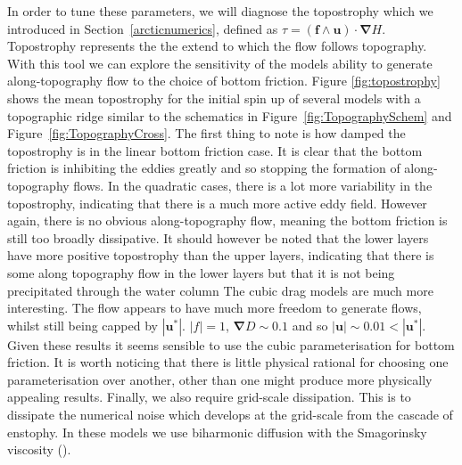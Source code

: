 \documentclass[12pt,a4paper]{report}
\newcommand*\figref[1]{Figure~\ref{#1}}
\newcommand*\secref[1]{Section~\ref{#1}}
\begin{document}
  In order to tune these parameters, we will diagnose the
  topostrophy which we introduced in \secref{arcticnumerics},
  defined as
  $\tau = \left(\boldsymbol{ f } \wedge
  \boldsymbol{ u } \right) \cdot \boldsymbol{\nabla} H $. 
  Topostrophy represents the the extend to which the flow
  follows topography. With this tool we can explore the sensitivity of the models
  ability to generate along-topography flow to the choice of bottom friction. 
  Figure \ref{fig:topostrophy} shows the mean topostrophy for the
  initial spin up of several models with a topographic ridge similar to
  the schematics in \figref{fig:TopographySchem} and
	\figref{fig:TopographyCross}. The first thing to note is how damped the 
  topostrophy is in the linear
  bottom friction case. It is clear that the bottom friction is inhibiting the 
  eddies greatly and so stopping the formation of along-topography flows. In
  the quadratic cases, there is a lot more variability in the topostrophy, indicating
  that there is a much more active eddy field. However again, there is no obvious
  along-topography flow, meaning the bottom friction is still too broadly dissipative.
  It should however be noted that the lower layers have more positive topostrophy than
  the upper layers, indicating that there is some along topography flow in the lower 
  layers but that it is not being precipitated  through the water column
  The cubic drag models are much more interesting. The flow appears to have much more
  freedom to generate flows, whilst still being capped by $\left|\boldsymbol{u}^{\ast}\right|$. $\left|f\right| = 1$, $\boldsymbol{\nabla} D \sim 0.1$ and so $\left|\boldsymbol{u}\right| \sim 0.01 < \left|\boldsymbol{u}^{\ast}\right|$.
  Given these results it seems sensible to use the cubic parameterisation for bottom 
  friction. It is worth noticing that there is little physical rational for choosing
  one parameterisation over another, other than one might produce more physically 
  appealing results. Finally, we also require grid-scale dissipation. This is to dissipate the
  numerical noise which develops at the grid-scale from the cascade of enstophy.
  In these models we use biharmonic diffusion with the Smagorinsky viscosity (\cite{smagorinsky1963general}). 
  
\end{document}
